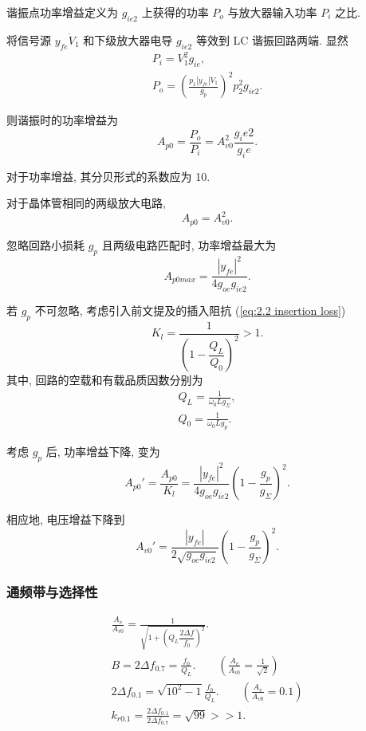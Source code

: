 谐振点功率增益定义为 $g_{ie2}$ 上获得的功率 $P_o$ 与放大器输入功率 $P_i$ 之比.

将信号源 $y_{fe}\dot{V}_1$ 和下级放大器电导 $g_{ie2}$ 等效到 LC 谐振回路两端. 显然
\begin{gather}
    P_i=V_1^2g_{ie}, \\
    P_o=\left(\frac{p_1|y_{fe}|\dot{V}_1}{g_p}\right)^2p_2^2g_{ie2}.
\end{gather}

则谐振时的功率增益为
\begin{equation}
    A_{p0}=\frac{P_o}{P_i}=A_{v0}^2\frac{g_ie2}{g_ie}.
\end{equation}

对于功率增益, 其分贝形式的系数应为 10.

对于晶体管相同的两级放大电路,
\begin{equation}
    A_{p0}=A_{v0}^2.
\end{equation}

忽略回路小损耗 $g_p$ 且两级电路匹配时, 功率增益最大为
\begin{equation}
    A_{p0max}=\frac{|y_{fe}|^2}{4g_{oe}g_{ie2}}.
\end{equation}

若 $g_p$ 不可忽略, 考虑引入前文提及的插入阻抗 (\ref{eq:2.2 insertion loss})
\begin{equation}
    K_l=\frac{1}{\left(1-\dfrac{Q_L}{Q_0}\right)^2}>1.
\end{equation}
其中, 回路的空载和有载品质因数分别为
\begin{gather}
    Q_L=\frac{1}{\omega_0Lg_\Sigma}, \\
    Q_0=\frac{1}{\omega_0Lg_p}.
\end{gather}

考虑 $g_p$ 后, 功率增益下降, 变为
\begin{equation}
    A_{p0}'=\frac{A_{p0}}{K_l}=\frac{|y_{fe}|^2}{4g_{oe}g_{ie2}}\left(1-\frac{g_p}{g_\Sigma}\right)^2.
\end{equation}

相应地, 电压增益下降到
\begin{equation}
    A_{v0}'=\frac{|y_{fe}|}{2\sqrt{g_{oe}g_{ie2}}}\left(1-\frac{g_p}{g_\Sigma}\right)^2.
\end{equation}

\subsubsection{通频带与选择性}
\rmg
\begin{gather}
    \frac{A_v}{A_{v0}}=\frac{1}{\sqrt{1+\left(Q_L\dfrac{2\Delta f}{f_0}\right)^2}}. \\
    B=2\Delta f_{0.7}=\frac{f_0}{Q_L}. \qquad \left(\frac{A_v}{A_{v0}}=\frac{1}{\sqrt{2}}\right) \\
    2\Delta f_{0.1}=\sqrt{10^2-1}\frac{f_0}{Q_L}. \qquad \left(\frac{A_v}{A_{v0}}=0.1\right) \\
    k_{r0.1}=\frac{2\Delta f_{0.1}}{2\Delta f_{0.7}}=\sqrt{99}>>1.
\end{gather}

